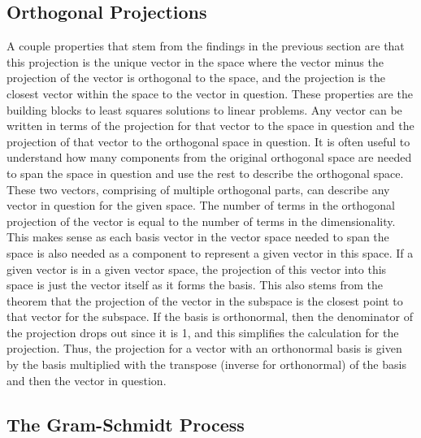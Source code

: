 \documentclass[12pt]{article}
\begin{document}
\subsection{Orthogonal Projections}
A couple properties that stem from the findings in the previous section are that this projection is the unique vector in the space where the vector minus the projection of the vector is 
orthogonal to the space, and the projection is the closest vector within the space to the vector in question. These properties are the building blocks to least squares solutions to 
linear problems. Any vector can be written in terms of the projection for that vector to the space in question and the projection of that vector to the orthogonal space in question. 
It is often useful to understand how many components from the original orthogonal space are needed to span the space in question and use the rest to describe the orthogonal space. 
These two vectors, comprising of multiple orthogonal parts, can describe any vector in question for the given space. The number of terms in the orthogonal projection of the vector 
is equal to the number of terms in the dimensionality. This makes sense as each basis vector in the vector space needed to span the space is also needed as a component to represent 
a given vector in this space. If a given vector is in a given vector space, the projection of this vector into this space is just the vector itself as it forms the basis. This also 
stems from the theorem that the projection of the vector in the subspace is the closest point to that vector for the subspace. If the basis is orthonormal, then the denominator 
of the projection drops out since it is 1, and this simplifies the calculation for the projection. Thus, the projection for a vector with an orthonormal basis is given by the basis 
multiplied with the transpose (inverse for orthonormal) of the basis and then the vector in question. 
\subsection{The Gram-Schmidt Process}
\end{document}
